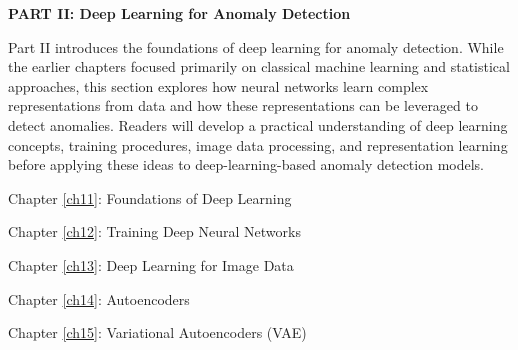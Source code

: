 \newpage

\vspace*{\fill}


\Large
\noindent\textbf{PART II: Deep Learning for Anomaly Detection}
\normalsize
\vspace*{3cm}


Part II introduces the foundations of deep learning for anomaly detection. While the earlier chapters focused primarily on classical machine learning and statistical approaches, this section explores how neural networks learn complex representations from data and how these representations can be leveraged to detect anomalies. Readers will develop a practical understanding of deep learning concepts, training procedures, image data processing, and representation learning before applying these ideas to deep-learning-based anomaly detection models.

\vspace*{0.5cm}

Chapter \ref{ch11}: Foundations of Deep Learning

Chapter \ref{ch12}: Training Deep Neural Networks

Chapter \ref{ch13}: Deep Learning for Image Data

Chapter \ref{ch14}: Autoencoders

Chapter \ref{ch15}: Variational Autoencoders (VAE)

\vspace*{\fill}

